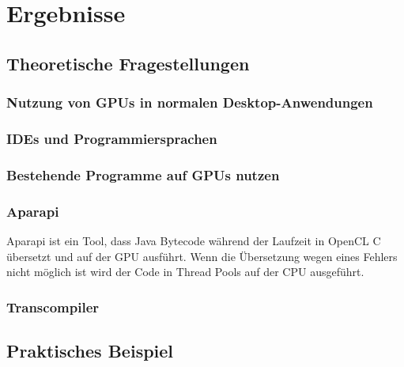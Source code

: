 
\section{Ergebnisse}
\label{sec:Ergebnisse}

\subsection{Theoretische Fragestellungen}
\subsubsection{Nutzung von GPUs in normalen Desktop-Anwendungen}
\subsubsection{IDEs und Programmiersprachen}
\subsubsection{Bestehende Programme auf GPUs nutzen}
\subsubsection{Aparapi}
Aparapi ist ein Tool, dass Java Bytecode während der Laufzeit in OpenCL C übersetzt und auf der GPU ausführt. Wenn die Übersetzung wegen eines Fehlers nicht möglich ist wird der Code in Thread Pools auf der CPU ausgeführt.\cite{aparapi}

\subsubsection{Transcompiler}

\newpage
\subsection{Praktisches Beispiel}
